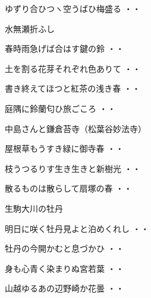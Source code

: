 \begin{shiika}ゆずり合ひつヽ空うばひ梅盛る
\hfill{・・}\end{shiika}
\vspace{ 0.4cm}
水無瀬折ふし
\begin{shiika}春時雨急げば合はす鍵の鈴
\hfill{・・}\end{shiika}
\begin{shiika}土を割る花芽それぞれ色ありて
\hfill{・・}\end{shiika}
\begin{shiika}書き終えてほつと紅茶の浅き春
\hfill{・・}\end{shiika}
\begin{shiika}庭隅に鈴蘭匂ひ旅ごころ
\hfill{・・}\end{shiika}
\vspace{ 0.4cm}
中島さんと鎌倉苔寺（松葉谷妙法寺）
\begin{shiika}屋根草もうすき緑に御寺春
\hfill{・・}\end{shiika}
\vspace{ 0.4cm}
\begin{shiika}枝うつるりす生き生きと新樹光
\hfill{・・}\end{shiika}
\vspace{ 0.4cm}
\begin{shiika}散るものは散らして扇塚の春
\hfill{・・}\end{shiika}
\vspace{ 0.4cm}
生駒大川の牡丹
\begin{shiika}明日に咲く牡丹見よと泊めくれし
\hfill{・・}\end{shiika}
\begin{shiika}牡丹の今開かむと息づかひ
\hfill{・・}\end{shiika}
\vspace{ 0.4cm}
\begin{shiika}身も心青く染まりぬ宮若葉
\hfill{・・}\end{shiika}
\begin{shiika}山越ゆるあの辺野崎か花曇
\hfill{・・}\end{shiika}
\vspace{ 0.4cm}
